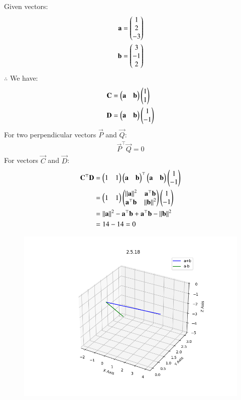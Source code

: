 \documentclass[journal,12pt,onecolumn]{IEEEtran}
\theoremstyle{remark}
\begin{document}
Given vectors:
\begin{align}
 \mathbf{a} &= \begin{pmatrix}1 \\ 2 \\ -3\end{pmatrix} \\
 \mathbf{b} &= \begin{pmatrix}3 \\ -1 \\ 2\end{pmatrix}
\end{align}
$\therefore$ We have:
\begin{align}
\vec{C} &= \myvec{\vec{a} & \vec{b}}\myvec{1 \\ 1} \\ %
\vec{D} &= \myvec{\vec{a} & \vec{b}}\myvec{1 \\ -1} %
\end{align}
For two perpendicular vectors $\vec{P}$ and $\vec{Q}$:
\begin{align}
 \vec{P}^\top\vec{Q} = 0
\end{align}
For vectors $\vec{C}$ and $\vec{D}$:
\begin{align}
 \mathbf{C}^\top\mathbf{D} &= \begin{pmatrix}1 & 1\end{pmatrix}\begin{pmatrix}\mathbf{a} & \mathbf{b}\end{pmatrix}^\top\begin{pmatrix}\mathbf{a} & \mathbf{b}\end{pmatrix}\begin{pmatrix}1 \\ -1\end{pmatrix} \\
 &= \begin{pmatrix}1 & 1\end{pmatrix}\begin{pmatrix}\left\lVert\mathbf{a}\right\rVert^2 & \mathbf{a}^\top\mathbf{b} \\ \mathbf{a}^\top\mathbf{b} & \left\lVert\mathbf{b}\right\rVert^2\end{pmatrix}\begin{pmatrix}1 \\ -1\end{pmatrix} \\
 &= \left\lVert\mathbf{a}\right\rVert^2 - \mathbf{a}^\top\mathbf{b} + \mathbf{a}^\top\mathbf{b} - \left\lVert\mathbf{b}\right\rVert^2 \\
 &= 14 - 14 = 0
\end{align}
\begin{figure}[H]
    \centering
    \includegraphics{figs/plot.png}
    \caption*{}
    \label{fig:plot}
\end{figure}
\end{document}
